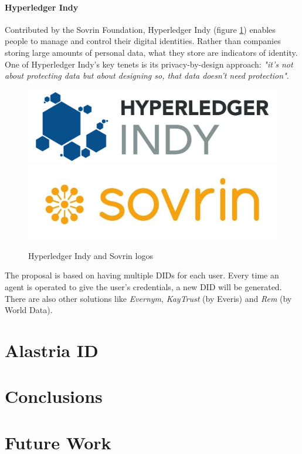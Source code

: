 \documentclass[a4paper, 12pt]{article} %
\begin{document}
                \paragraph{Hyperledger Indy}
                    Contributed by the Sovrin Foundation\cite{sovrin-yt}\cite{sovrin}, Hyperledger Indy\cite{indy-gh}\cite{indy} (figure \ref{fig:indy}) enables people to manage and control their digital identities. Rather than companies storing large amounts of personal data, what they store are indicators of identity. One of Hyperledger Indy's key tenets is its privacy-by-design approach: \textit{"it's not about protecting data but about designing so, that data doesn't need protection"}.\\
                    \begin{figure}[h]
                        \centering
                        \includegraphics[width=.3\textwidth]{hyper-indy.png}
                        \includegraphics[width=.3\textwidth]{Sovrin-Logo.jpg}\hfill
                        \caption{Hyperledger Indy and Sovrin logos}
                        \label{fig:indy}
                    \end{figure}
                    
                    The proposal is based on having multiple DIDs for each user. Every time an agent is operated to give the user's credentials, a new DID will be generated.\\
                    
                There are also other solutions\cite{ssi-wallets} like \textit{Evernym}, \textit{KayTrust} (by Everis) and \textit{Rem} (by World Data).
\newpage

\section{Alastria ID}

\newpage
\section{Conclusions}

\newpage
\section{Future Work}

\newpage
\printbibliography[heading=bibnumbered] %
\end{document}
